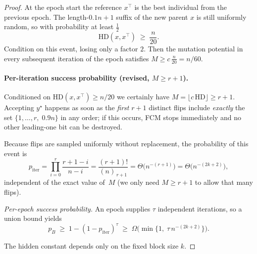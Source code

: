 \documentclass[lettersize,journal]{IEEEtran}
\begin{document}
\begin{proof}
	At the epoch start the reference \(x^\top\) is the best individual from the
	previous epoch.  
	The length-\(0.1n+1\) suffix of the new parent \(x\) is still uniformly random,
	so with probability at least \(\tfrac12\)
	\[
	\mathrm{HD}(x,x^\top)\;\ge\;\frac{n}{20}.
	\]
	Condition on this event, losing only a factor \(2\).
	Then the mutation potential in every subsequent
	iteration of the epoch satisfies
	\(
	M\ge c\,\tfrac{n}{20} = n/60.
	\)
	
	\paragraph*{Per-iteration success probability (revised, $M\ge r{+}1$).}
	Conditioned on $\mathrm{HD}(x,x^\top)\ge n/20$ we certainly have
	$M=\lfloor c\,\mathrm{HD}\rfloor\ge r+1$.
	Accepting $y^\star$ happens as soon as the \emph{first} $r{+}1$ distinct flips
	include \emph{exactly} the set
	\(\{1,\dots,r,\;0.9n\}\)
	in any order; if this occurs, FCM stops immediately and no other
	leading-one bit can be destroyed.
	
	Because flips are sampled uniformly without replacement, the probability of
	this event is
	\[
	p_{\text{iter}}
	=\prod_{i=0}^{r}\frac{r+1-i}{n-i}
	=\frac{(r+1)!}{(n)_{\,r+1}}
	=\Theta\!\bigl(n^{-(r+1)}\bigr)
	=\Theta\!\bigl(n^{-(2k+2)}\bigr),
	\]
	independent of the exact value of~$M$ (we only need $M\ge r{+}1$ to allow that
	many flips).
	
	\medskip\noindent
	\emph{Per-epoch success probability.}
	An epoch supplies \(\tau\) independent iterations, so a union bound yields
	\[
	p_B
	\;\ge\;
	1-(1-p_{\text{iter}})^{\tau}
	\;\ge\;
	\Omega\!\bigl(\min\{1,\;\tau\,n^{-(2k+2)}\}\bigr).
	\]
	
	\noindent
	The hidden constant depends only on the fixed block size \(k\).
	\end{proof}
\end{document}
